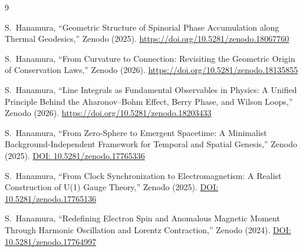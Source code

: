 \documentclass[%
 reprint,
 amsmath,amssymb,
 aps,
 prb,
]{revtex4-2}
\numberwithin{equation}{section}
\begin{document}
\begin{thebibliography}{9}


S.~Hanamura, ``Geometric Structure of Spinorial Phase Accumulation along Thermal Geodesics,'' Zenodo (2025). \href{https://doi.org/10.5281/zenodo.18067760}{https://doi.org/10.5281/zenodo.18067760}

S.~Hanamura, ``From Curvature to Connection: Revisiting the Geometric Origin of Conservation Laws,'' Zenodo (2026). \href{https://doi.org/10.5281/zenodo.18135855}{https://doi.org/10.5281/zenodo.18135855}

S.~Hanamura, ``Line Integrals as Fundamental Observables in Physics: A Unified Principle Behind the Aharonov--Bohm Effect, Berry Phase, and Wilson Loops,'' Zenodo (2026). \href{https://doi.org/10.5281/zenodo.18203433}{https://doi.org/10.5281/zenodo.18203433}


S.~Hanamura,
``From Zero-Sphere to Emergent Spacetime: A Minimalist Background-Independent Framework for Temporal and Spatial Genesis,''
Zenodo (2025).
\href{https://doi.org/10.5281/zenodo.17765336}{DOI: 10.5281/zenodo.17765336}

S.~Hanamura,
``From Clock Synchronization to Electromagnetism: A Realist Construction of U(1) Gauge Theory,''
Zenodo (2025).
\href{https://doi.org/10.5281/zenodo.17765136}{DOI: 10.5281/zenodo.17765136}

S.~Hanamura,
``Redefining Electron Spin and Anomalous Magnetic Moment Through Harmonic Oscillation and Lorentz Contraction,''
Zenodo (2024).
\href{https://doi.org/10.5281/zenodo.17764997}{DOI: 10.5281/zenodo.17764997}


\end{thebibliography}
\end{document}
